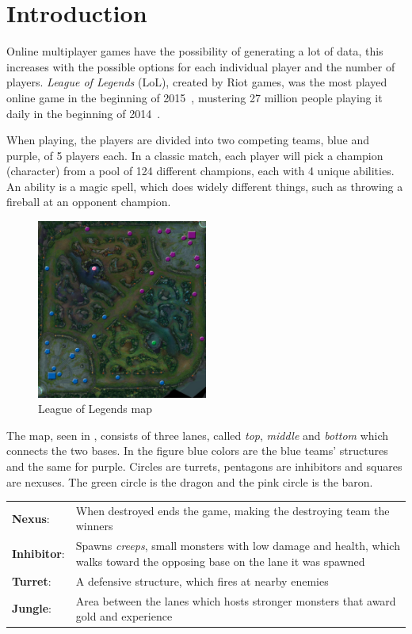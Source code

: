 \section{Introduction}\label{sec:intro}

Online multiplayer games have the possibility of generating a lot of data, this increases with the possible options for each individual player and the number of players. 
\emph{League of Legends} (LoL), created by Riot games, was the most played online game in the beginning of 2015~\cite{LoLmostplayed}, mustering 27 million people playing it daily in the beginning of 2014~\cite{LoL27mill}. 

When playing, the players are divided into two competing teams, blue and purple, of 5 players each. In a classic match, each player will pick a champion (character) from a pool of 124 different champions, each with 4 unique abilities. An ability is a magic spell, which does widely different things, such as throwing a fireball at an opponent champion.

\begin{figure}[!htb]%
  \centering
    \includegraphics[width=0.5\textwidth]{img/lolmap.jpg}
  \caption{League of Legends map}\label{fig:lolmap}
\end{figure}

The map, seen in , consists of three lanes, called \emph{top}, \emph{middle} and \emph{bottom} which connects the two bases. In the figure blue colors are the blue teams' structures and the same for purple. Circles are turrets, pentagons are inhibitors and squares are nexuses. The green circle is the dragon and the pink circle is the baron.

\begin{table}[!htb]
\begin{tabular}{l p{13cm}}
\textbf{Nexus}: & When destroyed ends the game, making the destroying team the winners\\
\textbf{Inhibitor}: & Spawns \emph{creeps}, small monsters with low damage and health, which walks toward the opposing base on the lane it was spawned\\
\textbf{Turret}: & A defensive structure, which fires at nearby enemies\\
\textbf{Jungle}: & Area between the lanes which hosts stronger monsters that award gold and experience\\
\end{tabular}
\end{table}

